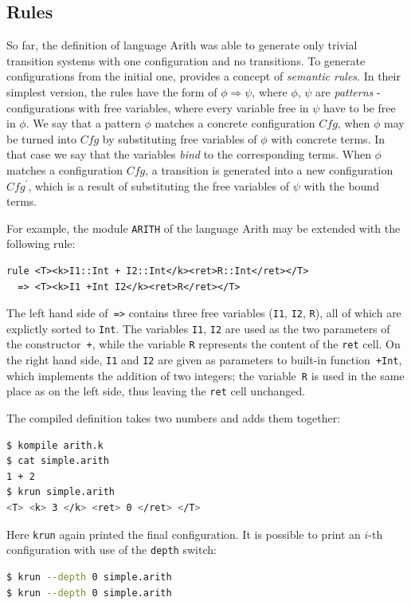 \documentclass{fithesis3}
\newcommand{\var}[1]{\mathit{#1}\xspace}
\newcommand{\krun}{\texttt{krun}\xspace}
\begin{document}
\subsection{Rules}
So far, the definition of language Arith was able to generate only trivial transition systems with one configuration and no transitions. To generate configurations from the initial one, \K provides a concept of \textit{semantic rules}. In their simplest version, the rules have the form of $\phi \Rightarrow \psi$, where $\phi$, $\psi$ are \textit{patterns} - configurations with free variables, where every variable free in $\psi$ have to be free in $\phi$. We say that a pattern $\phi$ matches a concrete configuration $\var{Cfg}$, when $\phi$ may be turned into $\var{Cfg}$ by substituting free variables of $\phi$ with concrete terms. In that case we say that the variables \textit{bind} to the corresponding terms. When $\phi$ matches a configuration $\var{Cfg}$, a transition is generated into a new configuration $\var{Cfg^\prime}$, which is a result of substituting the free variables of $\psi$ with the bound terms.

For example, the module \texttt{ARITH} of the language Arith may be extended with the following rule:
\begin{lstlisting}
rule <T><k>I1::Int + I2::Int</k><ret>R::Int</ret></T> 
  => <T><k>I1 +Int I2</k><ret>R</ret></T>
\end{lstlisting}
The left hand side of~\lstinline{=>}{} contains three free variables (\texttt{I1}, \texttt{I2}, \texttt{R}), all of which are explictly sorted to \texttt{Int}. The variables \texttt{I1}, \texttt{I2} are used as the two parameters of the constructor~\lstinline{+}{}, while the variable \texttt{R} represents the content of the \texttt{ret} cell. On the right hand side, \texttt{I1} and \texttt{I2} are given as parameters to built-in function~\lstinline{+Int}{}, which implements the addition of two integers; the variable~\texttt{R} is used in the same place as on the left side, thus leaving the \texttt{ret} cell unchanged.

The compiled definition takes two numbers and adds them together:
\begin{lstlisting}[language=bash]
$ kompile arith.k
$ cat simple.arith
1 + 2
$ krun simple.arith
<T> <k> 3 </k> <ret> 0 </ret> </T>
\end{lstlisting}
Here \krun again printed the final configuration. It is possible to print an $i$-th configuration with use of the \texttt{depth} switch:
\begin{lstlisting}[language=bash]
$ krun --depth 0 simple.arith
$ krun --depth 0 simple.arith
\end{lstlisting}
\end{document}
